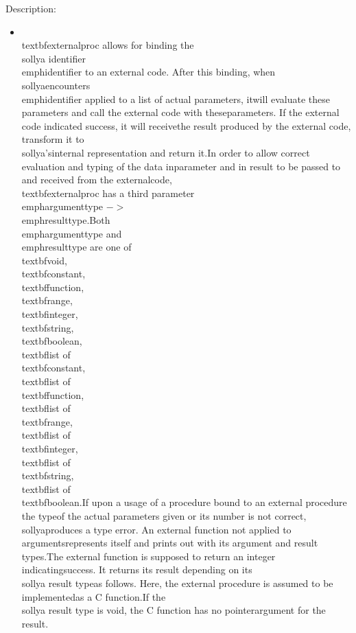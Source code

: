 \noindent Description: \begin{itemize}

\item \\textbf{externalproc} allows for binding the \\sollya identifier\n   \\emph{identifier} to an external code.  After this binding, when \\sollya\n   encounters \\emph{identifier} applied to a list of actual parameters, it\n   will evaluate these parameters and call the external code with these\n   parameters. If the external code indicated success, it will receive\n   the result produced by the external code, transform it to \\sollya's\n   internal representation and return it.\n    \n   In order to allow correct evaluation and typing of the data in\n   parameter and in result to be passed to and received from the external\n   code, \\textbf{externalproc} has a third parameter \\emph{argumenttype} $->$ \\emph{resulttype}.\n   Both \\emph{argumenttype} and \\emph{resulttype} are one of \\textbf{void}, \\textbf{constant},\n   \\textbf{function}, \\textbf{range}, \\textbf{integer}, \\textbf{string}, \\textbf{boolean}, \\textbf{list of} \\textbf{constant}, \\textbf{list of} \\textbf{function}, \n   \\textbf{list of} \\textbf{range}, \\textbf{list of} \\textbf{integer}, \\textbf{list of} \\textbf{string}, \\textbf{list of} \\textbf{boolean}.\n    \n   If upon a usage of a procedure bound to an external procedure the type\n   of the actual parameters given or its number is not correct, \\sollya\n   produces a type error. An external function not applied to arguments\n   represents itself and prints out with its argument and result types.\n    \n   The external function is supposed to return an integer indicating\n   success.  It returns its result depending on its \\sollya result type\n   as follows. Here, the external procedure is assumed to be implemented\n   as a C function.\n    \n   If the \\sollya result type is void, the C function has no pointer\n   argument for the result.  
\end{itemize}
